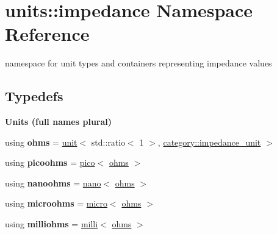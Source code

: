\hypertarget{namespaceunits_1_1impedance}{}\section{units\+:\+:impedance Namespace Reference}
\label{namespaceunits_1_1impedance}


namespace for unit types and containers representing impedance values  


\subsection*{Typedefs}
\begin{Indent}{\bf Units (full names plural)}\par
\begin{DoxyCompactItemize}
\item 
\hypertarget{namespaceunits_1_1impedance_af379a1ab6c308a0a6c5a6b6e613df507}{}using {\bfseries ohms} = \hyperlink{structunits_1_1unit}{unit}$<$ std\+::ratio$<$ 1 $>$, \hyperlink{namespaceunits_1_1category_a0b9fe7547ad43633e885a8b3c8201840}{category\+::impedance\+\_\+unit} $>$\label{namespaceunits_1_1impedance_af379a1ab6c308a0a6c5a6b6e613df507}

\item 
\hypertarget{namespaceunits_1_1impedance_a0c0e99491adf0fc2379d4bd0f2f820cc}{}using {\bfseries picoohms} = \hyperlink{group___unit_manipulators_ga82a8d14a3e0877a375a66b64c45baab9}{pico}$<$ \hyperlink{structunits_1_1unit}{ohms} $>$\label{namespaceunits_1_1impedance_a0c0e99491adf0fc2379d4bd0f2f820cc}

\item 
\hypertarget{namespaceunits_1_1impedance_ab3a27d8f64eef8ccf8637cbf46d9132b}{}using {\bfseries nanoohms} = \hyperlink{group___unit_manipulators_ga1c25c3c1d6c1f3aed3fd1ecf043110d5}{nano}$<$ \hyperlink{structunits_1_1unit}{ohms} $>$\label{namespaceunits_1_1impedance_ab3a27d8f64eef8ccf8637cbf46d9132b}

\item 
\hypertarget{namespaceunits_1_1impedance_a796b9d7ab375cfea06413e478e703aa2}{}using {\bfseries microohms} = \hyperlink{group___unit_manipulators_gaea53c906ec805110b93f02db4a961971}{micro}$<$ \hyperlink{structunits_1_1unit}{ohms} $>$\label{namespaceunits_1_1impedance_a796b9d7ab375cfea06413e478e703aa2}

\item 
\hypertarget{namespaceunits_1_1impedance_ae265bbcc1f48ae85cd2816942e60b58a}{}using {\bfseries milliohms} = \hyperlink{group___unit_manipulators_gaec9d1c320e180eb59f3cb3094d8079dd}{milli}$<$ \hyperlink{structunits_1_1unit}{ohms} $>$\label{namespaceunits_1_1impedance_ae265bbcc1f48ae85cd2816942e60b58a}


\end{DoxyCompactItemize}
\end{Indent}
